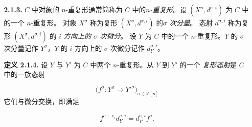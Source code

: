 \noindent\textbf{2.1.3.}\quad
$C$ 中对象的 $n$-重复形通常简称为 $C$ 中的\emph{$n$-重复形}。设
$(X^\sigma,d^{\sigma,i})$ 为 $C$ 中的一个 $n$-重复形。
对象 $X^\sigma$ 称为复形 $(X^\sigma,d^{\sigma,i})$ 的\emph{$\sigma$ 次分量}。
态射 $d^{\sigma,i}$ 称为复形 $(X^\sigma,d^{\sigma,i})$ 的
\emph{$i$ 方向上的 $\sigma$ 次微分}。
设 $Y$ 为 $C$ 中的一个 $n$-重复形。$Y$ 的 $\sigma$ 次分量记作
$Y^\sigma$，$Y$ 的 $i$ 方向上的 $\sigma$ 次微分记作 $d_Y^{\sigma,i}$。

\noindent\textbf{定义 2.1.4.}\quad
设 $Y$ 与 $Y'$ 为 $C$ 中两个 $n$-重复形。从 $Y$ 到 $Y'$ 的一个
\emph{复形态射}是 $C$ 中的一族态射

\begin{equation*}
  \bigl(f^\sigma\colon Y^\sigma\longrightarrow Y'^{\sigma}\bigr)_{
    \sigma\in\mathbb Z[n]}
\end{equation*}
它们与微分交换，即满足

\begin{equation}
  f^{\sigma+e_i}d_Y^{\sigma,i}
  =d_{Y'}^{\sigma,i}f^\sigma.
  \tag{2.1.4.1}
\end{equation}
